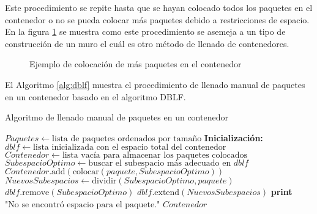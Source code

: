 Este procedimiento se repite hasta que se hayan colocado todos los paquetes en el contenedor o no se pueda colocar más paquetes debido a restricciones de espacio. En la figura \ref{fig:contruccion_muro} se muestra como este procedimiento se asemeja a un tipo de construcción de un muro el cuál es otro método de llenado de contenedores.

\begin{figure}[H]
    \centering
    
    \caption{Ejemplo de colocación de más paquetes en el contenedor}
    \label{fig:contruccion_muro}
\end{figure}

El Algoritmo \ref{alg:dblf} muestra el procedimiento de llenado manual de paquetes en un contenedor basado en el algoritmo DBLF.

\begin{algorithm}[H]
    \caption{Algoritmo de llenado manual de paquetes en un contenedor}
    \label{alg:dblf}
    \begin{algorithmic}[1]
        \State $Paquetes \gets \text{lista de paquetes ordenados por tamaño}$
        \State \textbf{Inicialización:} $dblf \gets \text{lista inicializada con el espacio total del contenedor}$
        \State $Contenedor \gets \text{lista vacía para almacenar los paquetes colocados}$
        \State $SubespacioOptimo \gets \text{buscar el subespacio más adecuado en } dblf$
        \State $Contenedor.\text{add}( \text{colocar}(paquete, SubespacioOptimo) )$
        \State $NuevosSubespacios \gets \text{dividir}(SubespacioOptimo, paquete)$
        \State $dblf.\text{remove}(SubespacioOptimo)$
        \State $dblf.\text{extend}(NuevosSubespacios)$
        \Else
        \State \textbf{print} $\text{"No se encontró espacio para el paquete."}$
        \EndIf
        \EndFor
        \State \Return $Contenedor$
    \end{algorithmic}
\end{algorithm}


